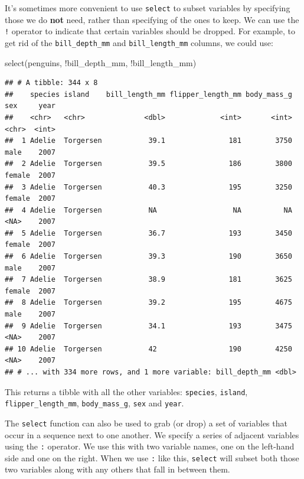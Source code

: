 \documentclass[
]{book}
\newenvironment{Shaded}{\begin{snugshade}}{\end{snugshade}}
\newcommand{\FunctionTok}[1]{\textcolor[rgb]{0.00,0.00,0.00}{#1}}
\newcommand{\NormalTok}[1]{#1}
\newcommand{\SpecialCharTok}[1]{\textcolor[rgb]{0.00,0.00,0.00}{#1}}
\begin{document}
It's sometimes more convenient to use \texttt{select} to subset variables by specifying those we do \textbf{not} need, rather than specifying of the ones to keep. We can use the \texttt{!} operator to indicate that certain variables should be dropped. For example, to get rid of the \texttt{bill\_depth\_mm} and \texttt{bill\_length\_mm} columns, we could use:

\begin{Shaded}
\begin{Highlighting}[]
\FunctionTok{select}\NormalTok{(penguins, }\SpecialCharTok{!}\NormalTok{bill\_depth\_mm, }\SpecialCharTok{!}\NormalTok{bill\_length\_mm)}
\end{Highlighting}
\end{Shaded}

\begin{verbatim}
## # A tibble: 344 x 8
##    species island    bill_length_mm flipper_length_mm body_mass_g sex     year
##    <chr>   <chr>              <dbl>             <int>       <int> <chr>  <int>
##  1 Adelie  Torgersen           39.1               181        3750 male    2007
##  2 Adelie  Torgersen           39.5               186        3800 female  2007
##  3 Adelie  Torgersen           40.3               195        3250 female  2007
##  4 Adelie  Torgersen           NA                  NA          NA <NA>    2007
##  5 Adelie  Torgersen           36.7               193        3450 female  2007
##  6 Adelie  Torgersen           39.3               190        3650 male    2007
##  7 Adelie  Torgersen           38.9               181        3625 female  2007
##  8 Adelie  Torgersen           39.2               195        4675 male    2007
##  9 Adelie  Torgersen           34.1               193        3475 <NA>    2007
## 10 Adelie  Torgersen           42                 190        4250 <NA>    2007
## # ... with 334 more rows, and 1 more variable: bill_depth_mm <dbl>
\end{verbatim}

This returns a tibble with all the other variables: \texttt{species}, \texttt{island}, \texttt{flipper\_length\_mm}, \texttt{body\_mass\_g}, \texttt{sex} and \texttt{year}.

The \texttt{select} function can also be used to grab (or drop) a set of variables that occur in a sequence next to one another. We specify a series of adjacent variables using the \texttt{:} operator. We use this with two variable names, one on the left-hand side and one on the right. When we use \texttt{:} like this, \texttt{select} will subset both those two variables along with any others that fall in between them.
\end{document}
